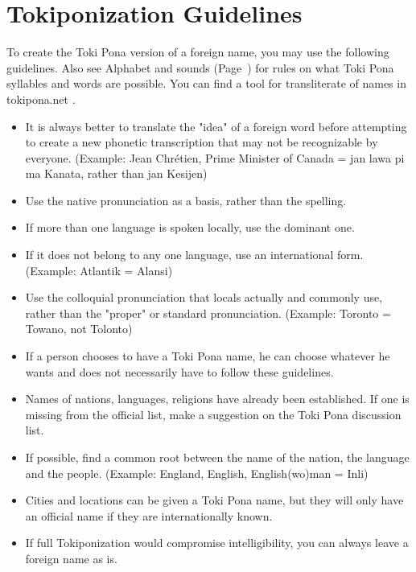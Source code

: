 
\section{Tokiponization Guidelines}

\label{'phonet_trans'}

To create the Toki Pona version of a foreign name, you may use the following guidelines.
Also see Alphabet and sounds (Page~\pageref{sec:pronunciation_alphabet}) for rules on what Toki Pona syllables and words are possible.
You can find a tool for transliterate of names in tokipona.net \cite{www:tokipona.net:01}.

\begin{itemize}
    \item
          It is always better to translate the "idea" of a foreign word before attempting to create a new phonetic transcription that may not be recognizable by everyone.
          (Example: Jean Chrétien, Prime Minister of Canada = jan lawa pi ma Kanata, rather than jan Kesijen)
    \item
          Use the native pronunciation as a basis, rather than the spelling.
    \item
          If more than one language is spoken locally, use the dominant one.
    \item
          If it does not belong to any one language, use an international form.
          (Example: Atlantik = Alansi)
    \item
          Use the colloquial pronunciation that locals actually and commonly use, rather than the "proper" or standard pronunciation.
          (Example: Toronto = Towano, not Tolonto)
    \item
          If a person chooses to have a Toki Pona name, he can choose whatever he wants and does not necessarily have to follow these guidelines.
    \item
          Names of nations, languages, religions have already been established.
          If one is missing from the official list, make a suggestion on the Toki Pona discussion list.
    \item
          If possible, find a common root between the name of the nation, the language and the people.
          (Example: England, English, English(wo)man = Inli)
    \item
          Cities and locations can be given a Toki Pona name, but they will only have an official name if they are internationally known.
    \item
          If full Tokiponization would compromise intelligibility, you can always leave a foreign name as is.
\end{itemize}

